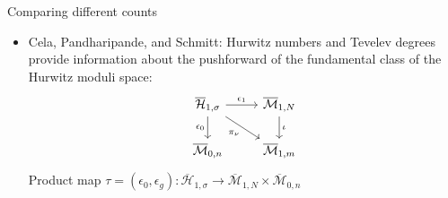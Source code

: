 \documentclass{beamer}
\theoremstyle{definition}
\begin{document}
                                                                                                                                                                                                                          \begin{frame}{Comparing different counts}

                                                                                                                                                                                                                            \begin{itemize}
                                                                                                                                                                                                                            \item Cela, Pandharipande, and Schmitt: Hurwitz numbers and Tevelev degrees provide information about the pushforward
                                                                                                                                                                                                                              of the fundamental class of the Hurwitz moduli space:
                                                                                                                                                                                                                                \[\begin{tikzcd}[ampersand replacement=\&]
	{\overline{\mathcal H}_{1,\sigma}} \& {\overline{\mathcal M}_{1,N}} \\
	{\overline{\mathcal M}_{0,n}} \& {\overline{\mathcal M}_{1,m}}
	\arrow["{\epsilon_1}", from=1-1, to=1-2]
	\arrow["{\epsilon_0}"', from=1-1, to=2-1]
	\arrow["{\pi_{\nu}}"', from=1-1, to=2-2]
	\arrow["\iota", from=1-2, to=2-2]
                                                                                                                                                                                                                                \end{tikzcd}\]
Product map $\tau=(\epsilon_0,\epsilon_g):\overline{\mathcal H}_{1,\sigma}\to\overline{\mathcal M}_{1,N}\times\overline{\mathcal M}_{0,n}$


\end{itemize}
\end{frame}
\end{document}
